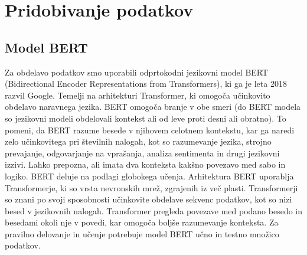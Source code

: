 \documentclass[sigconf,nonacm]{acmart}
\begin{document}
\section{Pridobivanje podatkov}
\subsection{Model BERT}
Za obdelavo podatkov smo uporabili odprtokodni jezikovni model BERT (Bidirectional Encoder Representations from Transformers), ki ga je leta 2018 razvil Google. Temelji na arhitekturi Transformer, ki omogoča učinkovito obdelavo naravnega jezika. BERT omogoča branje v obe smeri (do BERT modela so jezikovni modeli obdelovali kontekst ali od leve proti desni ali obratno). To pomeni, da BERT razume besede v njihovem celotnem kontekstu, kar ga naredi zelo učinkovitega pri številnih nalogah, kot so razumevanje jezika, strojno prevajanje, odgovarjanje na vprašanja, analiza sentimenta in drugi jezikovni izzivi. Lahko prepozna, ali imata dva konteksta kakšno povezavo med sabo in logiko. BERT deluje na podlagi globokega učenja. Arhitektura BERT uporablja Transformerje, ki so vrsta nevronskih mrež, zgrajenih iz več plasti. Transformerji so znani po svoji sposobnosti učinkovite obdelave sekvenc podatkov, kot so nizi besed v jezikovnih nalogah. Transformer pregleda povezave med podano besedo in besedami okoli nje v povedi, kar omogoča boljše razumevanje konteksta. Za pravilno delovanje in učenje potrebuje model BERT učno in testno množico podatkov.
\end{document}
